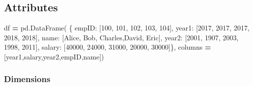 \documentclass[
]{book}
\newenvironment{Shaded}{\begin{snugshade}}{\end{snugshade}}
\newcommand{\DecValTok}[1]{\textcolor[rgb]{0.06,0.06,0.06}{#1}}
\newcommand{\NormalTok}[1]{#1}
\newcommand{\OperatorTok}[1]{\textcolor[rgb]{0.43,0.43,0.43}{\textbf{#1}}}
\newcommand{\StringTok}[1]{\textcolor[rgb]{0.5,0.5,0.5}{#1}}
\begin{document}
\hypertarget{attributes-6}{%
\subsection{Attributes}\label{attributes-6}}

\begin{Shaded}
\begin{Highlighting}[]
\NormalTok{df }\OperatorTok{=}\NormalTok{ pd.DataFrame(}
\NormalTok{    \{ }\StringTok{\textquotesingle{}empID\textquotesingle{}}\NormalTok{:  [}\DecValTok{100}\NormalTok{,      }\DecValTok{101}\NormalTok{,    }\DecValTok{102}\NormalTok{,      }\DecValTok{103}\NormalTok{,     }\DecValTok{104}\NormalTok{],}
      \StringTok{\textquotesingle{}year1\textquotesingle{}}\NormalTok{:   [}\DecValTok{2017}\NormalTok{,     }\DecValTok{2017}\NormalTok{,   }\DecValTok{2017}\NormalTok{,      }\DecValTok{2018}\NormalTok{,    }\DecValTok{2018}\NormalTok{],}
      \StringTok{\textquotesingle{}name\textquotesingle{}}\NormalTok{:   [}\StringTok{\textquotesingle{}Alice\textquotesingle{}}\NormalTok{,  }\StringTok{\textquotesingle{}Bob\textquotesingle{}}\NormalTok{,  }\StringTok{\textquotesingle{}Charles\textquotesingle{}}\NormalTok{,}\StringTok{\textquotesingle{}David\textquotesingle{}}\NormalTok{, }\StringTok{\textquotesingle{}Eric\textquotesingle{}}\NormalTok{],}
      \StringTok{\textquotesingle{}year2\textquotesingle{}}\NormalTok{:   [}\DecValTok{2001}\NormalTok{,     }\DecValTok{1907}\NormalTok{,   }\DecValTok{2003}\NormalTok{,      }\DecValTok{1998}\NormalTok{,    }\DecValTok{2011}\NormalTok{],}
      \StringTok{\textquotesingle{}salary\textquotesingle{}}\NormalTok{: [}\DecValTok{40000}\NormalTok{,    }\DecValTok{24000}\NormalTok{,  }\DecValTok{31000}\NormalTok{,     }\DecValTok{20000}\NormalTok{,   }\DecValTok{30000}\NormalTok{]\},}
\NormalTok{    columns }\OperatorTok{=}\NormalTok{ [}\StringTok{\textquotesingle{}year1\textquotesingle{}}\NormalTok{,}\StringTok{\textquotesingle{}salary\textquotesingle{}}\NormalTok{,}\StringTok{\textquotesingle{}year2\textquotesingle{}}\NormalTok{,}\StringTok{\textquotesingle{}empID\textquotesingle{}}\NormalTok{,}\StringTok{\textquotesingle{}name\textquotesingle{}}\NormalTok{])}
\end{Highlighting}
\end{Shaded}

\hypertarget{dimensions-1}{%
\subsubsection{Dimensions}\label{dimensions-1}}
\end{document}
